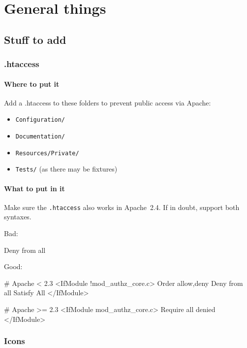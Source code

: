 \chapter{General things}

\section{Stuff to add}

\subsection{.htaccess}

\subsubsection{Where to put it}

Add a .htaccess to these folders to prevent public access via Apache:

\begin{itemize}
  \item \texttt{Configuration/}
  \item \texttt{Documentation/}
  \item \texttt{Resources/Private/}
  \item \texttt{Tests/} (as there may be fixtures)
\end{itemize}

\subsubsection{What to put in it}

Make sure the \texttt{.htaccess} also works in Apache~2.4. If in doubt, support both syntaxes.

Bad:

\begin{textcode}
Deny from all
\end{textcode}

Good:

\begin{textcode}
# Apache < 2.3
<IfModule !mod_authz_core.c>
  Order allow,deny
  Deny from all
  Satisfy All
</IfModule>

# Apache >= 2.3
<IfModule mod_authz_core.c>
  Require all denied
</IfModule>
\end{textcode}

\subsection{Icons}


